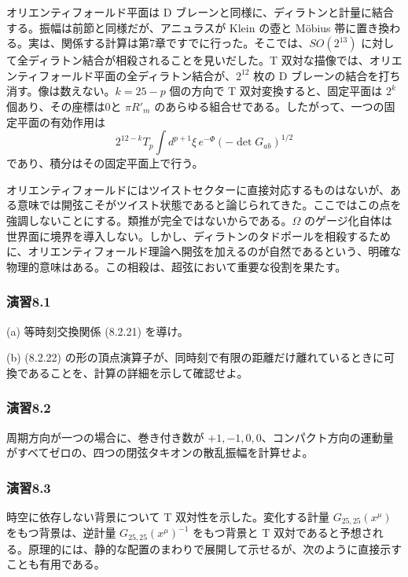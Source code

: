オリエンティフォールド平面は D ブレーンと同様に、ディラトンと計量に結合する。振幅は前節と同様だが、アニュラスが Klein の壺と Möbius 帯に置き換わる。実は、関係する計算は第7章ですでに行った。そこでは、$SO(2^{13})$ に対して全ディラトン結合が相殺されることを見いだした。T 双対な描像では、オリエンティフォールド平面の全ディラトン結合が、$2^{12}$ 枚の D ブレーンの結合を打ち消す。像は数えない。$k=25-p$ 個の方向で T 双対変換すると、固定平面は $2^k$ 個あり、その座標は0と $\pi R'_m$ のあらゆる組合せである。したがって、一つの固定平面の有効作用は
\begin{equation}
2^{12-k}T_p\int d^{p+1}\xi\,
e^{-\Phi}(-\det G_{ab})^{1/2}
\tag{8.8.5}\label{eq:8.8.5}
\end{equation}
であり、積分はその固定平面上で行う。

オリエンティフォールドにはツイストセクターに直接対応するものはないが、ある意味では開弦こそがツイスト状態であると論じられてきた。ここではこの点を強調しないことにする。類推が完全ではないからである。$\Omega$ のゲージ化自体は世界面に境界を導入しない。しかし、ディラトンのタドポールを相殺するために、オリエンティフォールド理論へ開弦を加えるのが自然であるという、明確な物理的意味はある。この相殺は、超弦において重要な役割を果たす。


\subsubsection*{演習8.1}\label{ex:8.1}
(a) 等時刻交換関係 (8.2.21) を導け。

(b) (8.2.22) の形の頂点演算子が、同時刻で有限の距離だけ離れているときに可換であることを、計算の詳細を示して確認せよ。

\subsubsection*{演習8.2}\label{ex:8.2}
周期方向が一つの場合に、巻き付き数が $+1,-1,0,0$、コンパクト方向の運動量がすべてゼロの、四つの閉弦タキオンの散乱振幅を計算せよ。

\subsubsection*{演習8.3}\label{ex:8.3}
時空に依存しない背景について T 双対性を示した。変化する計量 $G_{25,25}(x^\mu)$ をもつ背景は、逆計量 $G_{25,25}(x^\mu)^{-1}$ をもつ背景と T 双対であると予想される。原理的には、静的な配置のまわりで展開して示せるが、次のように直接示すことも有用である。

